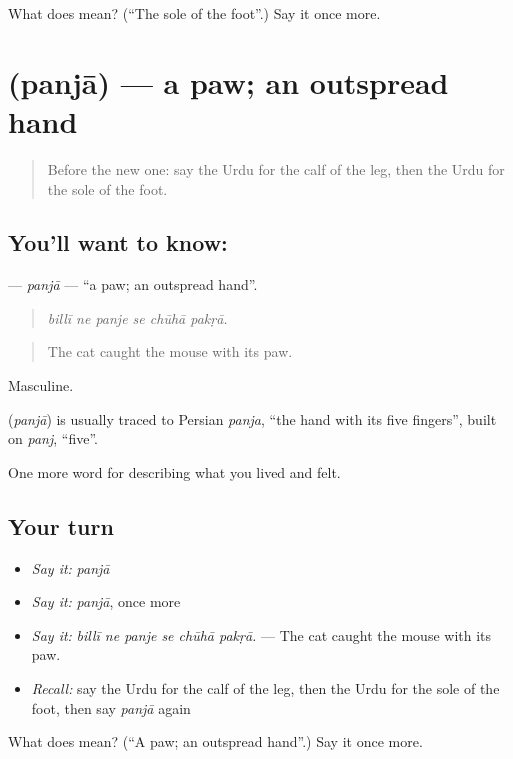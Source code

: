 \begin{tcolorbox}[breakable,colback=teal!4,colframe=teal!35!black,title={Before you move on}]
What does  mean? (\textquotedblleft{}The sole of the foot\textquotedblright{}.) Say it once more.
\end{tcolorbox}
\section[\texorpdfstring{\ur{پنجہ} (panjā)}{پنجہ (panjā)}]{ (panjā) — a paw; an outspread hand}

\label{lesson:UR-C466-panja}



\begin{quote}
Before the new one: say the Urdu for the calf of the leg, then the Urdu for the sole of the foot.
\end{quote}

\subsection*{You'll want to know: }
\textbf{} — \emph{panjā} — \textquotedblleft{}a paw; an outspread hand\textquotedblright{}.

\begin{quote}
     
\end{quote}

\begin{quote}
\emph{billī ne panje se chūhā pakṛā.}
\end{quote}

\begin{quote}
The cat caught the mouse with its paw.
\end{quote}

Masculine.

\begin{cousinweb}
\textbf{} (\emph{panjā}) is usually traced to Persian \emph{panja}, \textquotedblleft{}the hand with its five fingers\textquotedblright{}, built on \emph{panj}, \textquotedblleft{}five\textquotedblright{}.
\end{cousinweb}

\begin{grammarlens}[title={What you've built}]
One more word for describing what you lived and felt.
\end{grammarlens}

\subsection*{Your turn}
\begin{itemize}
\raggedright
  \item \emph{Say it:} \emph{panjā}
  \item \emph{Say it:} \emph{panjā}, once more
  \item \emph{Say it:} \emph{billī ne panje se chūhā pakṛā.} — The cat caught the mouse with its paw.
  \item \emph{Recall:} say the Urdu for the calf of the leg, then the Urdu for the sole of the foot, then say \emph{panjā} again
\end{itemize}

\begin{tcolorbox}[breakable,colback=teal!4,colframe=teal!35!black,title={Before you move on}]
What does  mean? (\textquotedblleft{}A paw; an outspread hand\textquotedblright{}.) Say it once more.
\end{tcolorbox}
